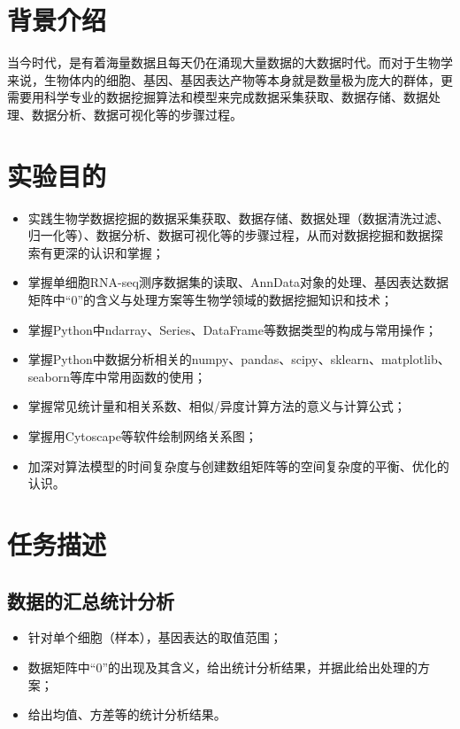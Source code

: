 \documentclass {article}
\begin{document}
\maketitle{}
\section{背景介绍}
	当今时代，是有着海量数据且每天仍在涌现大量数据的大数据时代。而对于生物学来说，生物体内的细胞、基因、基因表达产物等本身就是数量极为庞大的群体，更需要用科学专业的数据挖掘算法和模型来完成数据采集获取、数据存储、数据处理、数据分析、数据可视化等的步骤过程。
	
\section{实验目的}
	\begin{itemize}
		\item 实践生物学数据挖掘的数据采集获取、数据存储、数据处理（数据清洗过滤、归一化等）、数据分析、数据可视化等的步骤过程，从而对数据挖掘和数据探索有更深的认识和掌握；
		\item 掌握单细胞RNA-seq测序数据集的读取、AnnData对象的处理、基因表达数据矩阵中“0”的含义与处理方案等生物学领域的数据挖掘知识和技术；
		\item 掌握Python中ndarray、Series、DataFrame等数据类型的构成与常用操作；
		\item 掌握Python中数据分析相关的numpy、pandas、scipy、sklearn、matplotlib、seaborn等库中常用函数的使用；
		\item 掌握常见统计量和相关系数、相似/异度计算方法的意义与计算公式；
		\item 掌握用Cytoscape等软件绘制网络关系图；
		\item 加深对算法模型的时间复杂度与创建数组矩阵等的空间复杂度的平衡、优化的认识。
	\end{itemize}	

\section{任务描述}
	\subsection{数据的汇总统计分析}
		\begin{itemize}
			\item 针对单个细胞（样本），基因表达的取值范围；
			\item 数据矩阵中“0”的出现及其含义，给出统计分析结果，并据此给出处理的方案；
			\item 给出均值、方差等的统计分析结果。
		\end{itemize}
\end{document}
